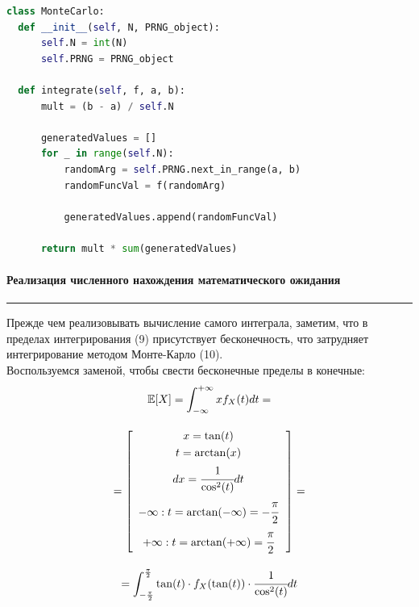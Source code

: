 \documentclass[a4paper, 14pt]{extarticle}
\begin{document}
\begin{center}
  \begin{lstlisting}[language=Python, caption={Реализация метода Монте-Карло}, label={lst:MonteCarlo}]
class MonteCarlo:
  def __init__(self, N, PRNG_object):
      self.N = int(N)
      self.PRNG = PRNG_object
  
  def integrate(self, f, a, b):
      mult = (b - a) / self.N
      
      generatedValues = []
      for _ in range(self.N):
          randomArg = self.PRNG.next_in_range(a, b)
          randomFuncVal = f(randomArg)

          generatedValues.append(randomFuncVal)
      
      return mult * sum(generatedValues)
  \end{lstlisting}
\end{center}

\paragraph{Реализация численного нахождения математического ожидания}\vspace{-20pt}\rule{\linewidth}{0.1mm}

Прежде чем реализовывать вычисление самого интеграла, заметим, что в пределах 
интегрирования (9) присутствует бесконечность, что затрудняет интегрирование 
методом Монте-Карло (10). \\
Воспользуемся заменой, чтобы свести бесконечные пределы в конечные:
\begin{gather*}
  \mathbb{E}[X] = \int_{-\infty}^{+\infty} x f_X(t)dt = \\[1em]
  = \left[\hspace{5pt}
    \begin{gathered}
    x       = \tan(t)                             \\
    t       = \arctan(x)                          \\
    dx      = \cfrac{1}{\cos^2(t)} dt             \\
    -\infty : t=\arctan(-\infty)= -\cfrac{\pi}{2} \\ 
    +\infty : t=\arctan(+\infty)= \cfrac{\pi}{2}  \\
    \end{gathered}\,
  \hspace{5pt}\right] = \\[1em]
  = \int_{-\frac{\pi}{2}}^{\frac{\pi}{2}} \tan(t) \cdot f_X(\tan(t)) \cdot \cfrac{1}{\cos^2(t)} dt
\end{gather*}
\end{document}
